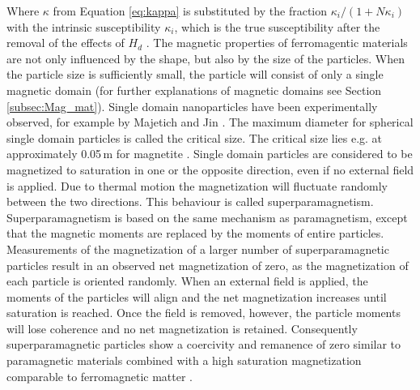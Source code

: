 Where $\kappa$ from Equation \ref{eq:kappa} is substituted by the fraction $\kappa_{i}/(1+N\kappa_{i})$ with the intrinsic susceptibility $\kappa_{i}$, which is the true susceptibility after the removal of the effects of $H_{d}$ \cite{FranzrebHabil,svoboda2004magnetic}.\newline 
The magnetic properties of ferromagentic materials are not only influenced by the shape, but also by the size of the particles. When the particle size is sufficiently small, the particle will consist of only a single magnetic domain (for further explanations of magnetic domains see Section \ref{subsec:Mag_mat}). Single domain nanoparticles have been experimentally observed, for example by Majetich and Jin \cite{majetich1999magnetization}. The maximum diameter for spherical single domain particles is called the critical size. The critical size lies e.g. at approximately 0.05\,\textmu m for magnetite \cite{svoboda2004magnetic,butler1975theoretical}. Single domain particles are considered to be magnetized to saturation in one or the opposite direction, even if no external field is applied. Due to thermal motion the magnetization will fluctuate randomly between the two directions. This behaviour is called superparamagnetism.
Superparamagnetism is based on the same mechanism as paramagnetism, except that the magnetic moments are replaced by the moments of entire particles. Measurements of the magnetization of a larger number of superparamagnetic particles result in an observed net magnetization of zero, as the magnetization of each particle is oriented randomly. When an external field is applied, the moments of the particles will align and the net magnetization increases until saturation is reached. Once the field is removed, however, the particle moments will lose coherence and no net magnetization is retained. Consequently superparamagnetic particles show a coercivity and remanence of zero similar to paramagnetic materials combined with a high saturation magnetization comparable to ferromagnetic matter \cite{svoboda2004magnetic,FranzrebHabil}.      
    
